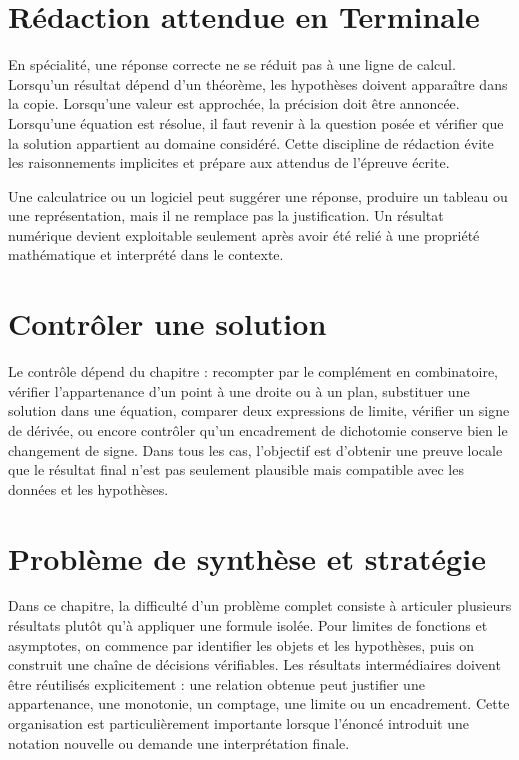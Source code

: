 \section{Rédaction attendue en Terminale}
En spécialité, une réponse correcte ne se réduit pas à une ligne de calcul. Lorsqu'un résultat dépend d'un théorème, les hypothèses doivent apparaître dans la copie. Lorsqu'une valeur est approchée, la précision doit être annoncée. Lorsqu'une équation est résolue, il faut revenir à la question posée et vérifier que la solution appartient au domaine considéré. Cette discipline de rédaction évite les raisonnements implicites et prépare aux attendus de l'épreuve écrite.

\begin{attention}
Une calculatrice ou un logiciel peut suggérer une réponse, produire un tableau ou une représentation, mais il ne remplace pas la justification. Un résultat numérique devient exploitable seulement après avoir été relié à une propriété mathématique et interprété dans le contexte.
\end{attention}

\section{Contrôler une solution}
Le contrôle dépend du chapitre : recompter par le complément en combinatoire, vérifier l'appartenance d'un point à une droite ou à un plan, substituer une solution dans une équation, comparer deux expressions de limite, vérifier un signe de dérivée, ou encore contrôler qu'un encadrement de dichotomie conserve bien le changement de signe. Dans tous les cas, l'objectif est d'obtenir une preuve locale que le résultat final n'est pas seulement plausible mais compatible avec les données et les hypothèses.

\section{Problème de synthèse et stratégie}

Dans ce chapitre, la difficulté d'un problème complet consiste à articuler plusieurs résultats plutôt qu'à appliquer une formule isolée. Pour limites de fonctions et asymptotes, on commence par identifier les objets et les hypothèses, puis on construit une chaîne de décisions vérifiables. Les résultats intermédiaires doivent être réutilisés explicitement : une relation obtenue peut justifier une appartenance, une monotonie, un comptage, une limite ou un encadrement. Cette organisation est particulièrement importante lorsque l'énoncé introduit une notation nouvelle ou demande une interprétation finale.


